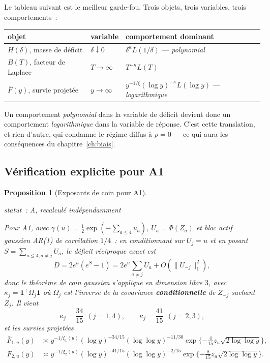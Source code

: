\documentclass[11pt]{article}
\theoremstyle{plain}
\newtheorem{proposition}[theoreme]{Proposition}
\theoremstyle{definition}
\theoremstyle{remark}
\newcommand{\1}{\mathbf 1}
\newcommand{\statut}[1]{%
  \nopagebreak\par\nopagebreak
  \hfill{\normalfont\footnotesize\textcolor{gris}{statut~: #1}}%
  \par\nopagebreak\vspace{-2pt}}
\begin{document}
\noindent
Le tableau suivant est le meilleur garde-fou. Trois objets, trois
variables, trois comportements~:
\begin{center}
\begin{tabular}{@{}lll@{}}
\toprule
objet & variable & comportement dominant\\
\midrule
$H(\delta)$, masse de déficit & $\delta\downarrow0$ &
  $\delta^{\kappa}L(1/\delta)$ \quad --- \emph{polynomial}\\
$B(T)$, facteur de Laplace & $T\to\infty$ & $T^{-\kappa}L(T)$\\
$\bar F(y)$, survie projetée & $y\to\infty$ &
  $y^{-1/\xi}(\log y)^{-\kappa}L(\log y)$ \quad --- \emph{logarithmique}\\
\bottomrule
\end{tabular}
\end{center}

\noindent
Un comportement \emph{polynomial} dans la variable de déficit devient
donc un comportement \emph{logarithmique} dans la variable de réponse.
C'est cette translation, et rien d'autre, qui condamne le régime diffus à
$\rho=0$ --- ce qui aura les conséquences du chapitre~\ref{ch:biais}.

\subsection{Vérification explicite pour A1}

\begin{proposition}[Exposants de coin pour A1]
\label{prop:kappa}
\statut{A, recalculé indépendamment}
Pour A1, avec $\gamma(u)=\tfrac12\exp(-\sum_{a\le4}u_a)$,
$U_a=\Phi(Z_a)$ et bloc actif gaussien AR(1) de corrélation $1/4$~:
en conditionnant sur $U_j=u$ et en posant
$S=\sum_{a\le4,a\ne j}U_a$, le déficit réciproque exact est
\[
 D=2e^u(e^S-1)=2e^u\!\!\sum_{a\ne j}U_a+O(\|U_{-j}\|_1^2),
\]
donc le théorème de coin gaussien s'applique en dimension libre $3$, avec
$\kappa_j=\bm1^\top\Omega_j\bm1$ où $\Omega_j$ est l'inverse de la
covariance \textbf{conditionnelle} de $Z_{-j}$ sachant $Z_j$. Il vient
\[
 \kappa_j=\frac{34}{15}\ \ (j=1,4),
 \qquad
 \kappa_j=\frac{41}{15}\ \ (j=2,3),
\]
et les survies projetées
\begin{align*}
 \bar F_{1,u}(y)&\asymp y^{-1/\xi_1(u)}(\log y)^{-34/15}
   (\log\log y)^{-11/30}\exp\{-\tfrac4{15}z_u\sqrt{2\log\log y}\},\\
 \bar F_{2,u}(y)&\asymp y^{-1/\xi_2(u)}(\log y)^{-41/15}
   (\log\log y)^{-2/15}\exp\{-\tfrac8{15}z_u\sqrt{2\log\log y}\}.
\end{align*}
\end{proposition}
\end{document}
